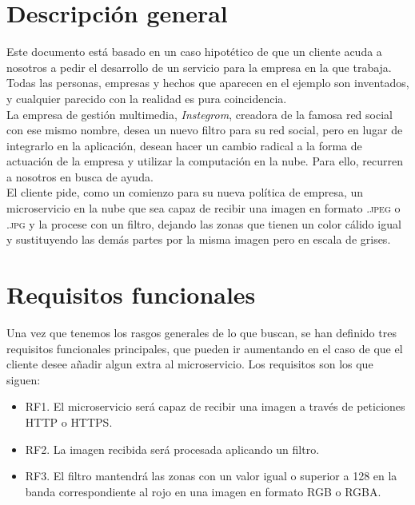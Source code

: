 \documentclass[11pt,a4paper]{article}
\begin{document}
\newpage

\section{Descripción general}
Este documento está basado en un caso hipotético de que un cliente acuda a nosotros a pedir el desarrollo de un servicio para la empresa en la que trabaja. Todas las personas, empresas y hechos que aparecen en el ejemplo son inventados, y cualquier parecido con la realidad es pura coincidencia.\\

La empresa de gestión multimedia, \textit{Instegrom}, creadora de la famosa red social con ese mismo nombre, desea un nuevo filtro para su red social, pero en lugar de integrarlo en la aplicación, desean hacer un cambio radical a la forma de actuación de la empresa y utilizar la computación en la nube. Para ello, recurren a nosotros en busca de ayuda.\\

El cliente pide, como un comienzo para su nueva política de empresa, un microservicio en la nube que sea capaz de recibir una imagen en formato \textsc{.jpeg} o \textsc{.jpg} y la procese con un filtro, dejando las zonas que tienen un color cálido igual y sustituyendo las demás partes por la misma imagen pero en escala de grises.

\section{Requisitos funcionales}
Una vez que tenemos los rasgos generales de lo que buscan, se han definido tres requisitos funcionales principales, que pueden ir aumentando en el caso de que el cliente desee añadir algun extra al microservicio. Los requisitos son los que siguen:

\begin{itemize}
	\item RF1. El microservicio será capaz de recibir una imagen a través de peticiones \textsc{HTTP} o \textsc{HTTPS}.
	\item RF2. La imagen recibida será procesada aplicando un filtro.
	\item RF3. El filtro mantendrá las zonas con un valor igual o superior a 128 en la banda correspondiente al rojo en una imagen en formato RGB o RGBA.
\end{itemize}
\end{document}
